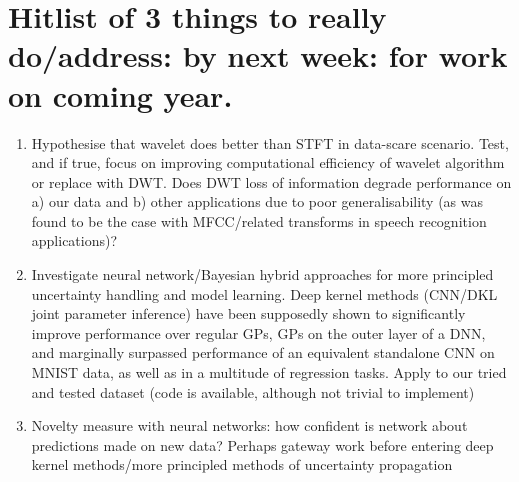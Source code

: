 \documentclass[12pt]{llncs}
\begin{document}
\section{Hitlist of 3 things to really do/address: by next week: for work on coming year.}
\begin{enumerate}
	\item Hypothesise that wavelet does better than STFT in data-scare scenario. Test, and if true, focus on improving computational efficiency of wavelet algorithm or replace with DWT. Does DWT loss of information degrade performance on a) our data and b) other applications due to poor generalisability (as was found to be the case with MFCC/related transforms in speech recognition applications)?
	\item Investigate neural network/Bayesian hybrid approaches for more principled uncertainty handling and model learning. Deep kernel methods (CNN/DKL joint parameter inference) have been supposedly shown to significantly improve performance over regular GPs, GPs on the outer layer of a DNN, and marginally surpassed performance of an equivalent standalone CNN on MNIST data, as well as in a multitude of regression tasks. Apply to our tried and tested dataset (code is available, although not trivial to implement)
	\item Novelty measure with neural networks: how confident is network about predictions made on new data? Perhaps gateway work before entering deep kernel methods/more principled methods of uncertainty propagation

\end{enumerate}
\end{document}
